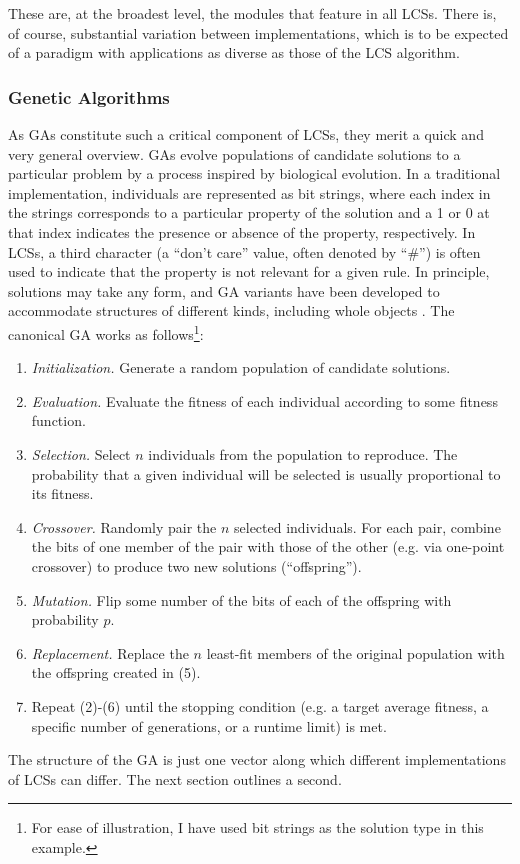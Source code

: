 \documentclass[11pt]{article}
\begin{document}
These are, at the broadest level, the modules that feature in all LCSs. There is, of course, substantial variation between implementations, which is to be expected of a paradigm with applications as diverse as those of the LCS algorithm.

\subsubsection{Genetic Algorithms}

As GAs constitute such a critical component of LCSs, they merit a quick and very general overview. GAs evolve populations of candidate solutions to a particular problem by a process inspired by biological evolution. In a traditional implementation, individuals are represented as bit strings, where each index in the strings corresponds to a particular property of the solution and a 1 or 0 at that index indicates the presence or absence of the property, respectively. In LCSs, a third character (a ``don't care'' value, often denoted by ``\#'') is often used to indicate that the property is not relevant for a given rule. In principle, solutions may take any form, and GA variants have been developed to accommodate structures of different kinds, including whole objects \cite{keijzer_evolving_2001}. The canonical GA works as follows\footnote{For ease of illustration, I have used bit strings as the solution type in this example.}:
\begin{enumerate}
\item \emph{Initialization.} Generate a random population of candidate solutions.
\item \emph{Evaluation.} Evaluate the fitness of each individual according to some fitness function.
\item \emph{Selection.} Select $n$ individuals from the population to reproduce. The probability that a given individual will be selected is usually proportional to its fitness.
\item \emph{Crossover.} Randomly pair the $n$ selected individuals. For each pair, combine the bits of one member of the pair with those of the other (e.g. via one-point crossover) to produce two new solutions (``offspring'').
\item \emph{Mutation.} Flip some number of the bits of each of the offspring with probability $p$.
\item \emph{Replacement.} Replace the $n$ least-fit members of the original population with the offspring created in (5).
\item Repeat (2)-(6) until the stopping condition (e.g. a target average fitness, a specific number of generations, or a runtime limit) is met.
\end{enumerate}
The structure of the GA is just one vector along which different implementations of LCSs can differ. The next section outlines a second.
\end{document}
